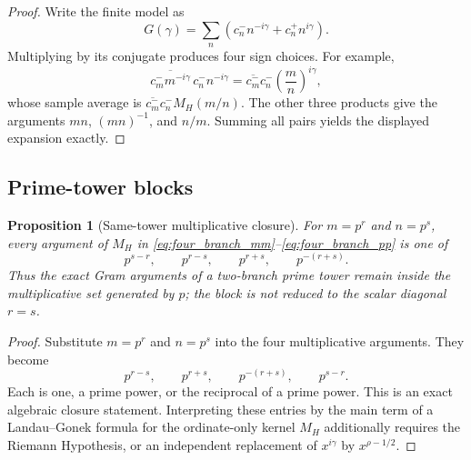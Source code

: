 \documentclass[11pt]{amsart}
\numberwithin{equation}{section}
\theoremstyle{plain}
\newtheorem{proposition}[theorem]{Proposition}
\theoremstyle{definition}
\theoremstyle{remark}
\newcommand{\1}{\mathbf{1}}
\begin{document}
\begin{proof}
Write the finite model as
\begin{equation}
G(\gamma)
=
\sum_n\left(c_n^-n^{-i\gamma}+c_n^+n^{i\gamma}\right).
\label{eq:four_branch_G_definition}
\end{equation}
Multiplying by its conjugate produces four sign choices.  For example,
\begin{equation}
\overline{c_m^-m^{-i\gamma}}\,c_n^-n^{-i\gamma}
=
\overline{c_m^-}c_n^-
\left(\frac mn\right)^{i\gamma},
\label{eq:four_branch_minus_minus}
\end{equation}
whose sample average is
\(\overline{c_m^-}c_n^-M_H(m/n)\).  The other three products give the
arguments \(mn\), \((mn)^{-1}\), and \(n/m\).  Summing all pairs yields
the displayed expansion exactly.
\end{proof}

\subsection{Prime-tower blocks}
\label{subsec:prime_tower_blocks}

\begin{proposition}[Same-tower multiplicative closure]
\label{prop:same_tower_resonance}
For $m=p^r$ and $n=p^s$, every argument of $M_H$ in
\eqref{eq:four_branch_mm}--\eqref{eq:four_branch_pp} is one of
\begin{equation}
p^{s-r},
\qquad
p^{r-s},
\qquad
p^{r+s},
\qquad
p^{-(r+s)}.
\label{eq:same_tower_arguments}
\end{equation}
Thus the exact Gram arguments of a two-branch prime tower remain inside
the multiplicative set generated by \(p\); the block is not reduced to the
scalar diagonal \(r=s\).
\end{proposition}

\begin{proof}
Substitute \(m=p^r\) and \(n=p^s\) into the four multiplicative arguments.
They become
\begin{equation}
p^{r-s},
\qquad
p^{r+s},
\qquad
p^{-(r+s)},
\qquad
p^{s-r}.
\label{eq:same_tower_arguments_proof}
\end{equation}
Each is one, a prime power, or the reciprocal of a prime power.  This is
an exact algebraic closure statement.  Interpreting these entries by the
main term of a Landau--Gonek formula for the ordinate-only kernel
\(M_H\) additionally requires the Riemann Hypothesis, or an independent
replacement of \(x^{i\gamma}\) by \(x^{\rho-1/2}\).
\end{proof}
\end{document}
